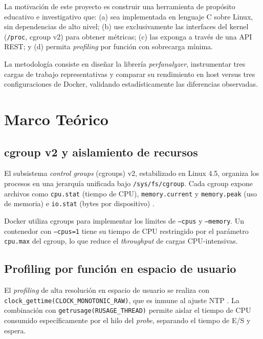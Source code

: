 \documentclass[conference]{IEEEtran}
\begin{document}
La motivación de este proyecto es construir una herramienta de propósito
educativo e investigativo que: (a) sea implementada en lenguaje C sobre Linux,
sin dependencias de alto nivel; (b) use exclusivamente las interfaces del kernel
(\texttt{/proc}, cgroup v2) para obtener métricas; (c) las exponga a través de
una API REST; y (d) permita \textit{profiling} por función con sobrecarga mínima.

La metodología consiste en diseñar la librería \textit{perfanalyzer},
instrumentar tres cargas de trabajo representativas y comparar su rendimiento
en host versus tres configuraciones de Docker, validando estadísticamente las
diferencias observadas.

\section{Marco Teórico}

\subsection{cgroup v2 y aislamiento de recursos}

El subsistema \textit{control groups} (cgroups) v2, estabilizado en Linux 4.5,
organiza los procesos en una jerarquía unificada bajo
\texttt{/sys/fs/cgroup}. Cada cgroup expone archivos como
\texttt{cpu.stat} (tiempo de CPU), \texttt{memory.current} y
\texttt{memory.peak} (uso de memoria) e \texttt{io.stat} (bytes por
dispositivo) \cite{docker2022monitor}.

Docker utiliza cgroups para implementar los límites de \texttt{--cpus} y
\texttt{--memory}. Un contenedor con \texttt{--cpus=1} tiene su tiempo de CPU
restringido por el parámetro \texttt{cpu.max} del cgroup, lo que reduce el
\textit{throughput} de cargas CPU-intensivas.

\subsection{Profiling por función en espacio de usuario}

El \textit{profiling} de alta resolución en espacio de usuario se realiza
con \texttt{clock\_gettime(CLOCK\_MONO\-TONIC\_RAW)}, que es inmune al ajuste
NTP \cite{intel2024profiling}. La combinación con \texttt{getrusage(RUSAGE\_THREAD)}
permite aislar el tiempo de CPU consumido específicamente por el hilo del
\textit{probe}, separando el tiempo de E/S y espera.
\end{document}
